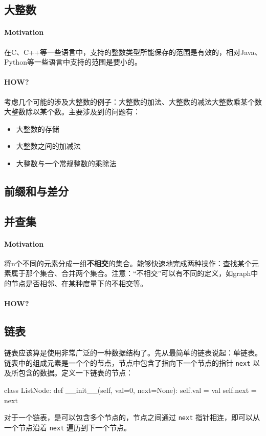 \subsection{大整数}
\paragraph{Motivation}在C、C++等一些语言中，支持的整数类型所能保存的范围是有效的，相对Java、Python等一些语言中支持的范围是要小的。

\paragraph{HOW?}考虑几个可能的涉及大整数的例子：大整数的加法、大整数的减法大整数乘某个数大整数除以某个数。主要涉及到的问题有：
\begin{itemize}
	\item 大整数的存储
	\item 大整数之间的加减法
	\item 大整数与一个常规整数的乘除法
\end{itemize}


\subsection{前缀和与差分}


\subsection{并查集}
\paragraph{Motivation}将n个不同的元素分成一组\textbf{不相交}的集合。能够快速地完成两种操作：查找某个元素属于那个集合、合并两个集合。注意：“不相交”可以有不同的定义，如graph中的节点是否相邻、在某种度量下的不相交等。

\paragraph{HOW?}

\subsection{链表}
链表应该算是使用非常广泛的一种数据结构了。先从最简单的链表说起：单链表。链表中的组成元素是一个个的节点，节点中包含了指向下一个节点的指针 \texttt{next} 以及所包含的数据。定义一下链表的节点：
\begin{python}
	class ListNode:
	     def __init__(self, val=0, next=None):
	         self.val = val
	         self.next = next
\end{python}
对于一个链表，是可以包含多个节点的，节点之间通过 \texttt{next} 指针相连，即可以从一个节点沿着 \texttt{next} 遍历到下一个节点。